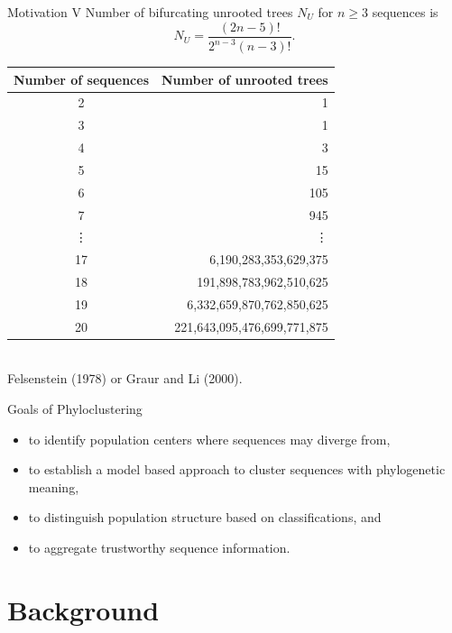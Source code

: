 \documentclass{beamer}
\begin{document}
\begin{frame}{Motivation V}
Number of bifurcating unrooted trees $N_U$ for $n\geq 3$ sequences is
$$
N_U = \frac{(2n - 5)!}{2^{n - 3} (n - 3)!}.
$$
\begin{center}
\begin{tabular}{cr} \hline\hline
Number of sequences & Number of unrooted trees \\ \hline
2 & 1 \\
3 & 1 \\
4 & 3 \\
5 & 15 \\
6 & 105 \\
7 & 945 \\
\vdots & \vdots \\
17 & 6,190,283,353,629,375 \\
18 & 191,898,783,962,510,625 \\
19 & 6,332,659,870,762,850,625 \\
20 & 221,643,095,476,699,771,875 \\ \hline\hline
\end{tabular}
\\
\scriptsize Felsenstein (1978) or Graur and Li (2000).
\end{center}

\end{frame}


\begin{frame}{Goals of Phyloclustering}
\begin{itemize}
\item to identify population centers where sequences may diverge from,
\item to establish a model based approach to cluster sequences
      with phylogenetic meaning,
\item to distinguish population structure based on classifications, and 
\item to aggregate trustworthy sequence information. 
\end{itemize}
\end{frame}


\section{Background}
\end{document}
